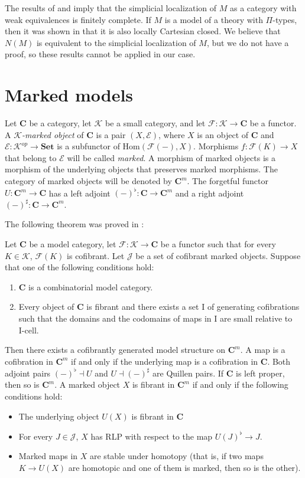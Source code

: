 \documentclass[reqno]{amsart}
\theoremstyle{definition}
\theoremstyle{remark}
\newcommand{\cat}[1]{\mathbf{#1}}
\newcommand{\C}{\cat{C}}
\newcommand{\Set}{\cat{Set}}
\newcommand{\K}{$\mathcal{K}$}
\newcommand{\Hom}{\mathrm{Hom}}
\newcommand{\I}{\mathrm{I}}
\newcommand{\class}[2]{#1\text{-}\mathrm{#2}}
\newcommand{\Icell}[1][\I]{\class{#1}{cell}}
\numberwithin{figure}{section}
\begin{document}
The results of \cite{szumilo} and \cite{kapulkin-szumilo} imply that the simplicial localization of $M$ as a category with weak equivalences is finitely complete.
If $M$ is a model of a theory with $\Pi$-types, then it was shown in \cite{kapulkin} that it is also locally Cartesian closed.
We believe that $N(M)$ is equivalent to the simplicial localization of $M$, but we do not have a proof, so these results cannot be applied in our case.

\section{Marked models}

Let $\C$ be a category, let $\mathcal{K}$ be a small category, and let $\mathcal{F} : \mathcal{K} \to \C$ be a functor.
A \emph{\K-marked object} of $\C$ is a pair $(X,\mathcal{E})$, where $X$ is an object of $\C$ and $\mathcal{E} : \mathcal{K}^{op} \to \Set$ is a subfunctor of $\Hom(\mathcal{F}(-),X)$.
Morphisms $f : \mathcal{F}(K) \to X$ that belong to $\mathcal{E}$ will be called \emph{marked}.
A morphism of marked objects is a morphism of the underlying objects that preserves marked morphisms.
The category of marked objects will be denoted by $\C^m$.
The forgetful functor $U : \C^m \to \C$ has a left adjoint $(-)^\flat : \C \to \C^m$ and a right adjoint $(-)^\sharp : \C \to \C^m$.

The following theorem was proved in \cite{marked-obj}:
\begin{thm}
Let $\C$ be a model category, let $\mathcal{F} : \mathcal{K} \to \C$ be a functor such that for every $K \in \mathcal{K}$, $\mathcal{F}(K)$ is cofibrant.
Let $\mathcal{J}$ be a set of cofibrant marked objects.
Suppose that one of the following conditions hold:
\begin{enumerate}
\item \label{it:comb} $\C$ is a combinatorial model category.
\item \label{it:all-fib} Every object of $\C$ is fibrant and there exists a set $\I$ of generating cofibrations such that
the domains and the codomains of maps in $\I$ are small relative to $\Icell$.
\end{enumerate}
Then there exists a cofibrantly generated model structure on $\C^m$.
A map is a cofibration in $\C^m$ if and only if the underlying map is a cofibration in $\C$.
Both adjoint pairs $(-)^\flat \dashv U$ and $U \dashv (-)^\sharp$ are Quillen pairs.
If $\C$ is left proper, then so is $\C^m$.
A marked object $X$ is fibrant in $\C^m$ if and only if the following conditions hold:
\begin{itemize}
\item The underlying object $U(X)$ is fibrant in $\C$
\item For every $J \in \mathcal{J}$, $X$ has RLP with respect to the map $U(J)^\flat \to J$.
\item Marked maps in $X$ are stable under homotopy (that is, if two maps $K \to U(X)$ are homotopic and one of them is marked, then so is the other).
\end{itemize}
\end{thm}
\end{document}
